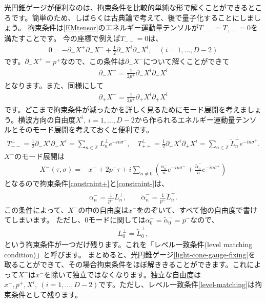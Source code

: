 \documentclass[report,paper=a4, fontsize=12pt, line_length=16cm, number_of_lines=34,dvipdfmx]{jlreq}
\numberwithin{equation}{chapter}
\numberwithin{equation}{section}
\newcommand{\Zb}{\mathbb{Z}}
\newcommand{\del}{\partial}
\newcommand{\alphat}{\tilde{\alpha}}
\newcommand{\Lp}{L^{\perp}}
\newcommand{\Ltp}{\widetilde{L}^{\perp}}
\begin{document}
光円錐ゲージが便利なのは、拘束条件を比較的単純な形で解くことができるところです。簡単のため、しばらくは古典論で考えて、後で量子化することにしましょう。
拘束条件は\eqref{EMtensor}のエネルギー運動量テンソルが$T_{--}=T_{++}=0$を満たすことです。
今の座標で例えば$T_{--}=0$は、
\begin{align}
0=-\del_{-}X^{+}\del_{-}X^{-}+\frac12 \del_{-}X^{i}\del_{-}X^{i},\quad(i=1,\dots,D-2)
\end{align}
です。$\del_{-}X^{+}=p^{+}$なので、この条件は$\del_{-}X^{-}$について解くことができて
\begin{align}
\del_{-}X^{-}=\frac{1}{2p^{+}}\del_{-}X^{i}\del_{-}X^{i}
\label{constraint+}
\end{align}
となります。また、同様にして
\begin{align}
\del_{+}X^{-}=\frac{1}{2p^{+}}\del_{+}X^{i}\del_{+}X^{i}
\label{constraint-}
\end{align}
です。どこまで拘束条件が減ったかを詳しく見るためにモード展開を考えましょう。横波方向の自由度$X^{i},\ i=1,\dots, D-2$から作られるエネルギー運動量テンソルとそのモード展開を考えておくと便利です。
\begin{align}
T^{\perp}_{--}=\frac{1}{2}\del_{-}X^{i}\del_{-}X^{i}=\sum_{n\in\Zb}\Lp_{n}e^{-in\sigma^{-}},\quad
T^{\perp}_{++}=\frac{1}{2}\del_{+}X^{i}\del_{+}X^{i}=\sum_{n\in\Zb}\Ltp_{n}e^{-in\sigma^{+}}.
\end{align}
$X^{-}$のモード展開は
\begin{align}
X^{-}(\tau,\sigma)=&x^{-}+2p^{-}\tau+i\sum_{n\ne 0} \left(
\frac{\alpha^{-}_{n}}{n}e^{-in\sigma^{-}}
+\frac{\alphat^{-}_{n}}{n}e^{-in\sigma^{+}}
\right)
\end{align}
となるので拘束条件\eqref{constraint+}と\eqref{constraint-}は、
\begin{align}
\alpha_n^{-}=\frac{1}{p^{+}} \Lp_{n},\qquad
\alphat_n^{-}=\frac{1}{p^{+}} \Ltp_{n}.\label{solution-constraint}
\end{align}
この条件によって、$X^{-}$の中の自由度は$x^{-}$をのぞいて、すべて他の自由度で書けてしまいます。
ただし、0モードに関しては$\alpha_0^{-}=\alphat_0^{-}=p^{-}$なので、
\begin{align}
\Lp_{0}=\Ltp_{0},\label{level-matching}
\end{align}
という拘束条件が一つだけ残ります。これを「レベル一致条件(level matching condition)」と呼びます。
まとめると、光円錐ゲージ\eqref{light-cone-gauge-fixing}を取ることができて、その場合拘束条件をほぼ解ききることができます。これによって$X^{-}$は$x^{-}$を除いて独立ではなくなります。独立な自由度は
$x^{-},p^{+}, X^{i},\ (i=1,\dots,D-2)$です。ただし、レベル一致条件\eqref{level-matching}は拘束条件として残ります。
\end{document}
